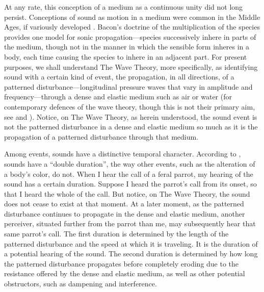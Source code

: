 At any rate, this conception of a medium as a continuous unity did not long persist. Conceptions of sound as motion in a medium were common in the Middle Ages, if variously developed \citep{Pasnau:2000aa}. Bacon's doctrine of the multiplication of the species provides one model for sonic propagation---species successively inhere in parts of the medium, though not in the manner in which the sensible form inheres in a body, each time causing the species to inhere in an adjacent part. For present purposes, we shall understand The Wave Theory, more specifically, as identifying sound with a certain kind of event, the propagation, in all directions, of a patterned disturbance---longitudinal pressure waves that vary in amplitude and frequency---through a dense and elastic medium such as air or water (for contemporary defences of the wave theory, though this is not their primary aim, see \citealt{OShaughnessy:2009aa} and \citealt{Sorensen:2009aa}). Notice, on The Wave Theory, as herein understood, the sound event is not the patterned disturbance in a dense and elastic medium so much as it is the propagation of a patterned disturbance through that medium. 

Among events, sounds have a distinctive temporal character. According to \citet{OShaughnessy:2009aa}, sounds have a ``double duration'', the way other events, such as the alteration of a body's color, do not. When I hear the call of a feral parrot, my hearing of the sound has a certain duration. Suppose I heard the parrot's call from its onset, so that I heard the whole of the call. But notice, on The Wave Theory, the sound does not cease to exist at that moment. At a later moment, as the patterned disturbance continues to propagate in the dense and elastic medium, another perceiver, situated further from the parrot than me, may subsequently hear that same parrot's call. The first duration is determined by the length of the patterned disturbance and the speed at which it is traveling. It is the duration of a potential hearing of the sound. The second duration is determined by how long the patterned disturbance propagates before completely eroding due to the resistance offered by the dense and elastic medium, as well as other potential obstructors, such as dampening and interference.

